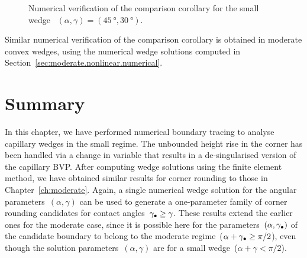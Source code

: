 \begin{figure}
  \centering
  \begin{subfigure}[t]{0.45\textwidth}
  \end{subfigure}
  \hfill
  \begin{subfigure}[t]{0.5\textwidth}
  \end{subfigure}
  \caption{
    Numerical verification of the comparison corollary
    for the small wedge~%
    $(\alpha, \gamma) = (\SI{45}{\degree}, \SI{30}{\degree})$.
  }
  \label{fig:wedge_small-modification}
\end{figure}

Similar numerical verification of the comparison corollary
is obtained in moderate convex wedges,
using the numerical wedge solutions computed
in Section~\ref{sec:moderate.nonlinear.numerical}.

\section{Summary}
\label{sec:small.summary}

In this chapter, we have performed numerical boundary tracing
to analyse capillary wedges in the small regime.
The unbounded height rise in the corner has been handled
via a change in variable
that results in a de-singularised version of the capillary BVP\@.
After computing wedge solutions using the finite element method,
we have obtained similar results for corner rounding
to those in Chapter~\ref{ch:moderate}.
Again, a single numerical wedge solution
for the angular parameters~$(\alpha, \gamma)$
can be used to generate
a one-parameter family of corner rounding candidates
for contact angles~$\gamma_\bullet \ge \gamma$.
These results extend the earlier ones for the moderate case,
since it is possible here
for the parameters~$(\alpha, \gamma_\bullet)$ of the candidate boundary
to belong to the moderate regime~($\alpha + \gamma_\bullet \ge \pi/2$),
even though the solution parameters~$(\alpha, \gamma)$
are for a small wedge~($\alpha + \gamma < \pi/2$).

